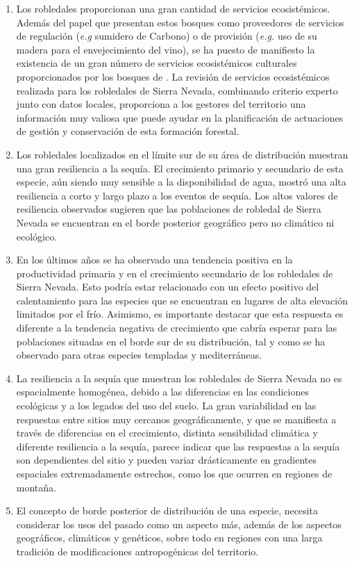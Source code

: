 \begin{enumerate}
    \item Los robledales proporcionan una gran cantidad de servicios ecosistémicos. Además del papel que presentan estos bosques como proveedores de servicios de regulación (\emph{e.g} sumidero de Carbono) o de provisión (\emph{e.g.} uso de su madera para el envejecimiento del vino), se ha puesto de manifiesto la existencia de un gran número de servicios ecosistémicos culturales proporcionados por los bosques de \Qp. La revisión de servicios ecosistémicos realizada para los robledales de Sierra Nevada, combinando criterio experto junto con datos locales, proporciona a los gestores del territorio una información muy valiosa que puede ayudar en la planificación de actuaciones de gestión y conservación de esta formación forestal. 
    
    \item Los robledales localizados en el límite sur de su área de distribución muestran una gran resiliencia a la sequía. El crecimiento primario y secundario de esta especie, aún siendo muy sensible a la disponibilidad de agua, mostró una alta resiliencia a corto y largo plazo a los eventos de sequía. Los altos valores de resiliencia observados sugieren que las poblaciones de robledal de Sierra Nevada se encuentran en el borde posterior geográfico pero no climático ni ecológico. 
    
    \item En los últimos años se ha observado una tendencia positiva en la productividad primaria y en el crecimiento secundario de los robledales de Sierra Nevada. Esto podría estar relacionado con un efecto positivo del calentamiento para las especies que se encuentran en lugares de alta elevación limitados por el frío. Asimismo, es importante destacar que esta respuesta es diferente a la tendencia negativa de crecimiento que cabría esperar para las poblaciones situadas en el borde sur de su distribución, tal y como se ha observado para otras especies templadas y mediterráneas. 
    
    \item La resiliencia a la sequía que muestran los robledales de Sierra Nevada no es espacialmente homogénea, debido a las diferencias en las condiciones ecológicas y a los legados del uso del suelo. La gran variabilidad en las respuestas entre sitios muy cercanos geográficamente, y que se manifiesta a través de diferencias en el crecimiento, distinta sensibilidad climática y diferente resiliencia a la sequía, parece indicar que las respuestas a la sequía son dependientes del sitio y pueden variar drásticamente en gradientes espaciales extremadamente estrechos, como los que ocurren en regiones de montaña. 
    
    \item El concepto de borde posterior de distribución de una especie, necesita considerar los usos del pasado como un aspecto más, además de los aspectos geográficos, climáticos y genéticos, sobre todo en regiones con una larga tradición de modificaciones antropogénicas del territorio.  
    
\end{enumerate}


